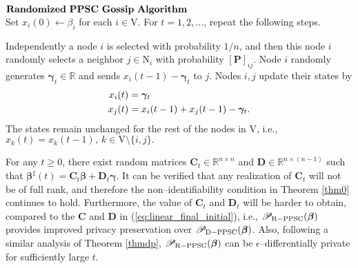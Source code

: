 \documentclass[a4paper, 11pt]{article}
\newcommand{\R}{\mathbb{R}}
\newcommand{\1}{\mathbf{1}}
\newcommand{\Cb}{\mathbf{C}}
\newcommand{\Db}{\mathbf{D}}
\newcommand{\mV}{\mathrm{V}}
\newcommand{\gammab}{{\bm \gamma}}
\newcommand{\betab}{\bm{\beta}}
\begin{document}
\begin{algorithm}[H]
	{$\mathbf{Randomized\textnormal{ }PPSC\textnormal{ }Gossip\  Algorithm}$}\\
	Set $x_i(0)\gets\beta_i$ for each $i\in\mV$. For $t=1,2,\dots$, repeat the following steps.
	\begin{algorithmic}[1]
		\STATE Independently a node $i$ is selected with probability $1/n$, and then this node $i$ randomly selects a neighbor $j\in\mathrm{N}_i$ with probability $[\mathbf{P}]_{ij}$.
		\STATE Node $i$ randomly generates $\gammab_t\in\R$ and sends $x_{i}(t-1)-\gammab_t$ to $j$.
		\STATE Nodes $i,j$ update their states by
		\begin{equation}\notag
		\begin{aligned}
		x_{i}(t) &= \gammab_t\\
		x_{j}(t) &= x_{i}(t-1) + x_{j}(t-1) - \gammab_t.
		\end{aligned}
		\end{equation}
		\STATE The states remain unchanged for the rest of the nodes in $\mV$, i.e.,
		$
		x_k(t)=x_k(t-1),\ k\in\mV\setminus\{i,j\}.
		$
	\end{algorithmic}
\end{algorithm}

For any $t\ge0$, there exist random matrices $\Cb_t\in\R^{n\times n}$ and $\Db\in\R^{n\times (n-1)}$ such that $\betab^\sharp(t)=\Cb_t\betab+\Db_t\gammab$. It can be verified that any realization of $\Cb_t$ will not be of full rank, and therefore the non--identifiability condition in Theorem \ref{thm0} continues to hold. Furthermore, the value of $\Cb_t$ and $\Db_t$ will be harder to obtain, compared to the $\Cb$ and $\Db$ in (\ref{eq:linear_final_initial}), i.e., $\mathscr{P}_{\rm R-PPSC}(\betab)$ provides improved privacy preservation over $\mathscr{P}_{\rm D-PPSC}(\betab)$. Also, following a similar analysis of Theorem \ref{thmdp}, $\mathscr{P}_{\rm R-PPSC}(\betab)$ can be $\epsilon$--differentially private for sufficiently large $t$.
\end{document}

